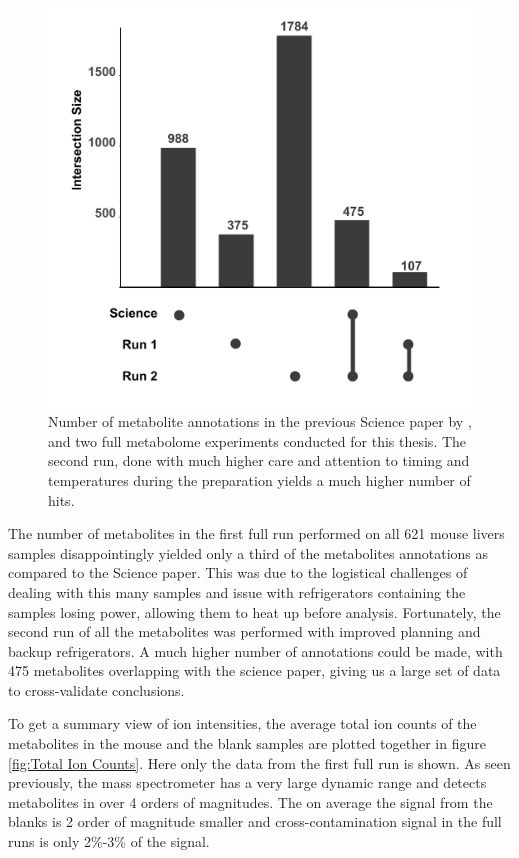 \documentclass[a4paper,11pt,twoside]{book}
\begin{document}
\begin{figure}[bht!]
		\centering
		\includegraphics[width=0.7\linewidth]{3.Metabolomics/Metabolite_Set_Overlap}
		\caption{ Number of metabolite annotations in the previous Science paper by \citeauthor{Williams2016SystemsFunction}, and two full metabolome experiments conducted for this thesis. The second run, done with much higher care and attention to timing and temperatures during the preparation yields a much higher number of hits.}
		\label{fig:Unique Metabolite Annotations}
\end{figure}

The number of metabolites in the first full run performed on all 621 mouse livers samples disappointingly yielded only a third of the metabolites annotations as compared to the Science paper. This was due to the logistical challenges of dealing with this many samples and issue with refrigerators containing the samples losing power, allowing them to heat up before analysis. Fortunately, the second run of all the metabolites was performed with improved planning and backup refrigerators. A much higher number of annotations could be made, with 475 metabolites overlapping with the science paper, giving us a large set of data to cross-validate conclusions.

To get a summary view of ion intensities, the average total ion counts of the metabolites in the mouse and the blank samples are plotted together in figure \ref{fig:Total Ion Counts}. Here only the data from the first full run is shown. As seen previously, the mass spectrometer has a very large dynamic range and detects metabolites in over 4 orders of magnitudes. The on average the signal from the blanks is 2 order of magnitude smaller and cross-contamination signal in the full runs is only 2\%-3\% of the signal.
	
\end{document}
